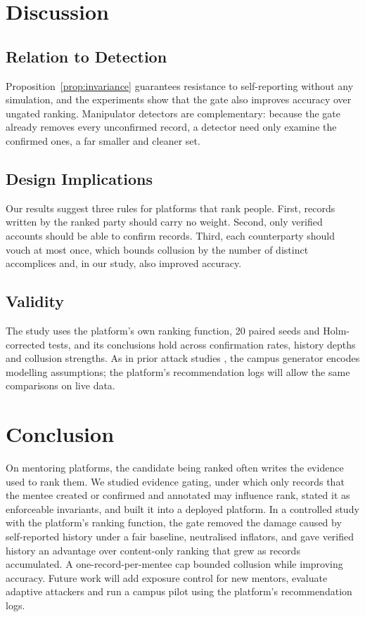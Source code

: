 \documentclass[conference]{IEEEtran}
\begin{document}
\section{Discussion}
\label{sec:discussion}
\subsection{Relation to Detection}
Proposition~\ref{prop:invariance} guarantees resistance to self-reporting without any simulation, and the experiments show that the gate also improves accuracy over ungated ranking. Manipulator detectors \cite{li2016,fang2018,sundar2020} are complementary: because the gate already removes every unconfirmed record, a detector need only examine the confirmed ones, a far smaller and cleaner set.

\subsection{Design Implications}
Our results suggest three rules for platforms that rank people. First, records written by the ranked party should carry no weight. Second, only verified accounts should be able to confirm records. Third, each counterparty should vouch at most once, which bounds collusion by the number of distinct accomplices and, in our study, also improved accuracy.

\subsection{Validity}
The study uses the platform's own ranking function, 20 paired seeds and Holm-corrected tests, and its conclusions hold across confirmation rates, history depths and collusion strengths. As in prior attack studies \cite{mobasher2007}, the campus generator encodes modelling assumptions; the platform's recommendation logs will allow the same comparisons on live data.

\section{Conclusion}
On mentoring platforms, the candidate being ranked often writes the evidence used to rank them. We studied evidence gating, under which only records that the mentee created or confirmed and annotated may influence rank, stated it as enforceable invariants, and built it into a deployed platform. In a controlled study with the platform's ranking function, the gate removed the damage caused by self-reported history under a fair baseline, neutralised inflators, and gave verified history an advantage over content-only ranking that grew as records accumulated. A one-record-per-mentee cap bounded collusion while improving accuracy. Future work will add exposure control for new mentors, evaluate adaptive attackers and run a campus pilot using the platform's recommendation logs.



\end{document}
